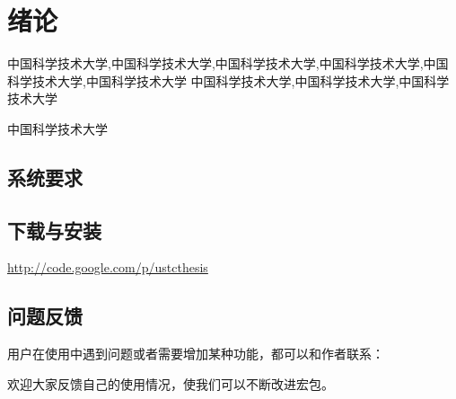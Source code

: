 ﻿
\chapter{绪论}
\label{chap:introduction}

中国科学技术大学,中国科学技术大学,中国科学技术大学,中国科学技术大学,中国科学技术大学,中国科学技术大学
中国科学技术大学,中国科学技术大学,中国科学技术大学


中国科学技术大学

\section{系统要求}



\section{下载与安装}


\href{http://code.google.com/p/ustcthesis}{http://code.google.com/p/ustcthesis}


\section{问题反馈}

用户在使用中遇到问题或者需要增加某种功能，都可以和作者联系：


欢迎大家反馈自己的使用情况，使我们可以不断改进宏包。
